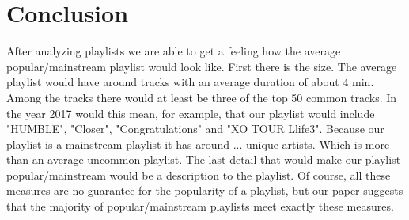 \section{Conclusion}

After analyzing  playlists we are able to get a feeling how the average popular/mainstream playlist would look like. First there is the size. The average playlist would have around  tracks with an average duration of about 4 min. Among the tracks there would at least be three of the top 50 common tracks. In the year 2017 would this mean, for example, that our playlist would include "HUMBLE", "Closer", "Congratulations" and "XO TOUR Llife3". Because our playlist is a mainstream playlist it has around ... unique artists. Which is more than an average uncommon playlist. The last detail that would make our playlist popular/mainstream would be a description to the playlist. Of course, all these measures are no guarantee for the popularity of a playlist, but our paper suggests that the majority of popular/mainstream playlists meet exactly these measures.